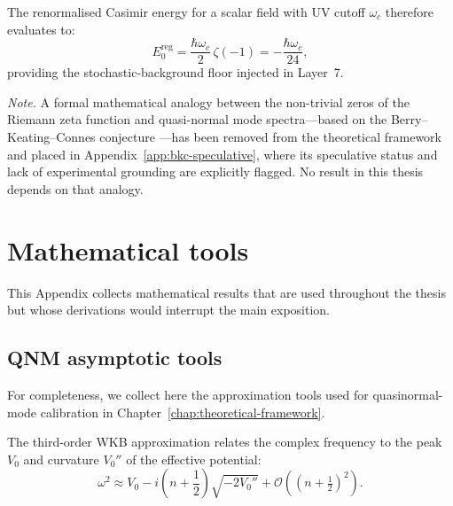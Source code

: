 \documentclass[11pt,a4paper, english]{book}
\theoremstyle{plain}
\theoremstyle{definition}
\numberwithin{equation}{chapter}
\numberwithin{figure}{chapter}
\numberwithin{table}{chapter}
\begin{document}
The renormalised Casimir energy for a scalar field with UV cutoff $\omega_c$ therefore evaluates to:
\begin{equation}
  \label{eq:casimir_reg}
  E_0^\mathrm{reg} = \frac{\hbar\omega_c}{2}\,\zeta(-1)
    = -\frac{\hbar\omega_c}{24},
\end{equation}
providing the stochastic-background floor injected in Layer~7.

\textit{Note.} A formal mathematical analogy between the non-trivial zeros of the Riemann zeta function and quasi-normal mode spectra---based on the Berry--Keating--Connes conjecture \cite{Berry_Keating_1999,Connes_1999}---has been removed from the theoretical framework and placed in Appendix~\ref{app:bkc-speculative}, where its speculative status and lack of experimental grounding are explicitly flagged. No result in this thesis depends on that analogy.


\chapter{Mathematical tools}
\label{app:math-tools}

This Appendix collects mathematical results that are used throughout the
thesis but whose derivations would interrupt the main exposition.

\section{QNM asymptotic tools}
\label{app:qnm-tools}

For completeness, we collect here the approximation tools used for
quasinormal-mode calibration in Chapter~\ref{chap:theoretical-framework}.

The third-order WKB approximation relates the complex frequency to the
peak $V_0$ and curvature $V_0''$ of the effective potential:
\[
\omega^2 \approx V_0 - i\left(n+\frac{1}{2}\right)\sqrt{-2V_0''}
  + \mathcal{O}\!\left((n+\tfrac{1}{2})^2\right).
\]
\end{document}

